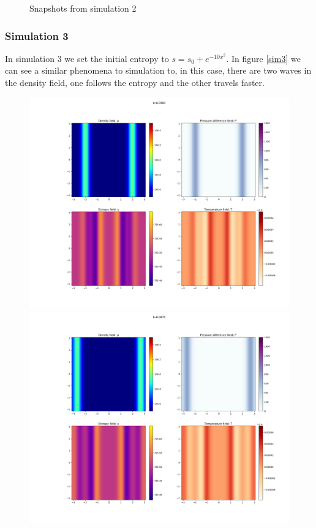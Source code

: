 \documentclass{article}
\begin{document}
\begin{figure}[h]
    \caption{Snapshots from simulation 2}
    \label{sim2}
\end{figure}

\subsubsection{Simulation 3}
In simulation 3 we set the initial entropy to \(s = s_0 + e^{-10x^2}\).
In figure \ref{sim3} we can see a similar phenomena to simulation to, in this case, there are two waves in the density field, one follows the entropy and the other travels faster.

\begin{figure}[h]
    \includegraphics[width=\textwidth/3]{Sim 2/SF02_0020.png}
    \includegraphics[width=\textwidth/3]{Sim 2/SF02_0027.png}

\end{figure}
\end{document}
